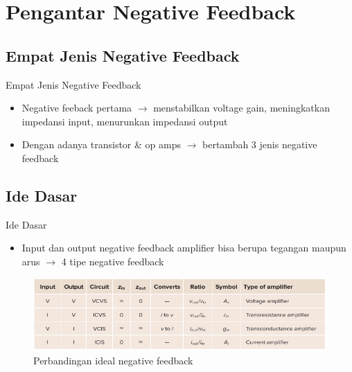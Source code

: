\section{Pengantar Negative Feedback}

\subsection{Empat Jenis Negative Feedback}	
\begin{frame}{Empat Jenis Negative Feedback}	
	\begin{itemize}
		\item Negative feeback pertama $ \rightarrow $ menstabilkan voltage gain, meningkatkan impedansi input, menurunkan impedansi output
		\item Dengan adanya transistor \& op amps $\rightarrow$ bertambah 3 jenis negative feedback
	\end{itemize}
\end{frame}

\subsection{Ide Dasar}
\begin{frame}{Ide Dasar}
	\begin{itemize}
		\item Input dan output negative feedback amplifier bisa berupa tegangan maupun arus $ \rightarrow $ 4 tipe negative feedback
	\end{itemize}
	\begin{figure}
		\centering
		\includegraphics[width=1\linewidth]{gambar/table-17.01}
		\caption{Perbandingan ideal negative feedback}
		\label{tabel-17.1}
	\end{figure}
\end{frame}

